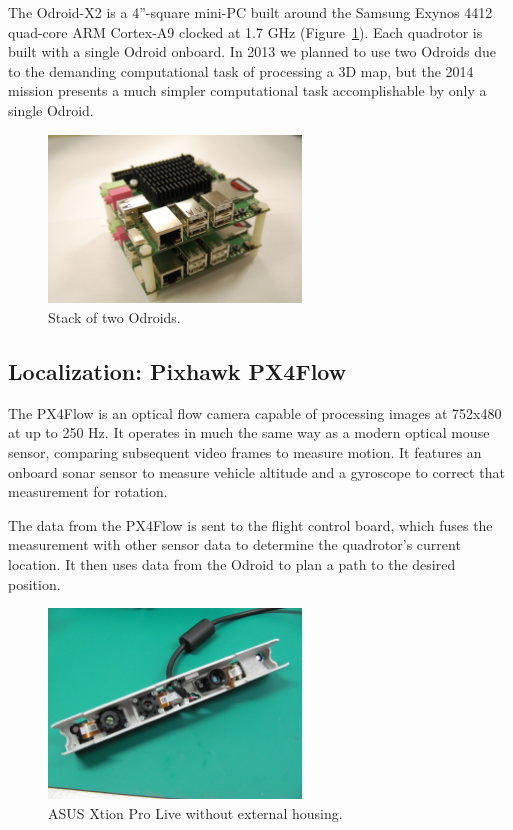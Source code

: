 \documentclass[12pt,letterpaper]{article} \usepackage[margin=1in]{geometry}
\begin{document}
The Odroid-X2 is a 4''-square mini-PC built around the Samsung Exynos 4412
quad-core ARM Cortex-A9 clocked at 1.7 GHz (Figure~\ref{fig:odroids}). Each
quadrotor is built with a single Odroid onboard. In 2013 we planned to use two
Odroids due to the demanding computational task of processing a 3D map, but the
2014 mission presents a much simpler computational task accomplishable by only a
single Odroid.

\begin{figure}[!h]
	\centering
	\includegraphics[width=0.6\textwidth]{img/odroid_stack.jpg}
	\caption{Stack of two Odroids.}
	\label{fig:odroids}
\end{figure}


\subsection*{Localization: Pixhawk PX4Flow}

The PX4Flow is an optical flow camera capable of processing images at 752x480 at
up to 250 Hz. It operates in much the same way as a modern optical mouse sensor,
comparing subsequent video frames to measure motion. It features an onboard
sonar sensor to measure vehicle altitude and a gyroscope to correct that
measurement for rotation.

The data from the PX4Flow is sent to the flight control board, which fuses the
measurement with other sensor data to determine the quadrotor's current
location. It then uses data from the Odroid to plan a path to the desired
position.

\begin{figure}[!h]
	\centering
	\includegraphics[width=0.6\textwidth]{img/xtion.jpg}
	\caption{ASUS Xtion Pro Live without external housing.}
	\label{fig:xtion}
\end{figure}
\end{document}
